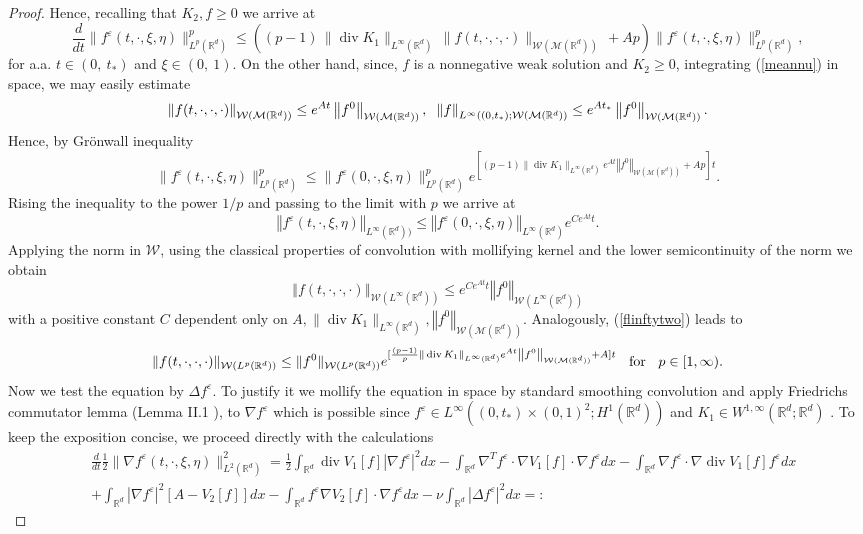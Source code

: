 \documentclass[10pt]{article}
\def\divv{\operatorname {div}}
\newcommand{\eqq}[2]{\begin{equation}  #1  \label{#2}\end{equation}    }
\newcommand{\hd}{\hspace{0.2cm}}
\newcommand{\m}[1]{\mbox{#1}}
\newcommand*{\norm}[1]{\left\Vert{#1}\right\Vert}
\newcommand*{\abs}[1]{\left\vert{#1}\right\vert}
\newcommand{\ve}{\varepsilon}
\newcommand{\R}{\mathbb{R}}
\newcommand{\ird}{\int_{\mathbb{R}^d}}
\newcommand{\W}{\mathcal{W}}
\begin{document}
\begin{proof}
Hence, recalling that $K_2, f \geq 0$ we arrive at
\[
\frac{d}{dt} \|f^\ve(t,\cdot,\xi,\eta)\|_{L^p(\R^d)}^p 
\leq \left((p-1)\,\|\divv K_1\|_{L^\infty(\R^d)}\,\| f(t,\cdot,\cdot,\cdot)\|_{\W(\mathcal{M}(\R^d))}\, + Ap\right)\|f^\ve(t,\cdot,\xi,\eta)\|_{L^p(\R^d)}^p,
\]
for a.a. $t\in (0,\ t_*)$ and $\xi\in (0,\ 1)$.
On the other hand, since, $f$ is a nonnegative weak solution and $K_2 \geq 0$, integrating (\ref{meannu}) in space,  we may easily estimate
\eqq{
\norm{f(t,\cdot,\cdot,\cdot)}_{\W(\mathcal{M}(\R^d))} \leq e^{At} \norm{f^0}_{\W(\mathcal{M}(\R^d))}, \hd \norm{f}_{L^{\infty}((0,t_*);\W(\mathcal{M}(\R^d))} \leq e^{At_*} \norm{f^0}_{\W(\mathcal{M}(\R^d))}.
}{flinfty}
Hence, by Gr\"onwall inequality
\eqq{
\|f^\ve(t,\cdot,\xi,\eta)\|_{L^p(\R^d)}^p \leq  \|f^\ve(0,\cdot,\xi,\eta)\|_{L^p(\R^d)}^p e^{[(p-1)\|\divv K_1\|_{L^\infty(\R^d)}e^{At}\norm{f^0}_{\W(\mathcal{M}(\R^d))} +Ap]t}.
}{flinftytwo}
Rising the inequality to the power $1/p$ and passing to the limit with $p$ we arrive at
\[
\norm{f^\ve(t,\cdot,\xi,\eta)}_{L^\infty(\R^d))} \leq \norm{f^\ve(0,\cdot,\xi,\eta)}_{L^\infty(\R^d)} e^{Ce^{At}t}.
\]
Applying the norm in $\W$, using the classical properties of convolution with mollifying kernel and the lower semicontinuity of the norm we obtain
\eqq{
 \norm{f(t,\cdot,\cdot,\cdot)}_{\W(L^\infty(\R^d))} \leq e^{Ce^{At}t}\norm{f^0}_{\W(L^\infty(\R^d))}
}{finftyinfty}
with a positive constant $C$ dependent only on $A, \|\divv K_1\|_{L^\infty(\R^d)},\norm{f^0}_{\W(\mathcal{M}(\R^d))}$. 
Analogously, (\ref{flinftytwo}) leads to
\eqq{
\|f(t,\cdot,\cdot,\cdot)\|_{\W(L^p(\R^d))} \leq  \|f^0\|_{\W(L^p(\R^d))}e^{[\frac{(p-1)}{p}\|\divv K_1\|_{L^\infty(\R^d)}e^{At}\norm{f^0}_{\W(\mathcal{M}(\R^d))} +A]t} \hd \m{ for } \hd p \in [1,\infty).
}{flinftytwof}
Now we test the equation by $\Delta f^\ve$. To justify it we mollify the equation in space by standard smoothing convolution and apply Friedrichs commutator lemma (Lemma II.1 \cite{diPerna}), to $\nabla f^\ve$ which is possible since $f^\ve \in L^{\infty}((0,t_{*})\times (0,1)^2;H^{1}(\R^d))$ and $K_1 \in W^{1,\infty}(\R^d;\R^d)$ . To keep the exposition concise, we proceed directly with the calculations
\begin{align}\label{gradba}
    &\frac{d}{dt} \frac{1}{2}\|\nabla f^\ve(t,\cdot,\xi,\eta)\|_{L^2(\R^d)}^2=\frac{1}{2}\ird \divv V_1[f] \abs{\nabla f^\ve}^{2} dx-\ird \nabla^T f^\ve\cdot \nabla V_1[f] \cdot \nabla f^\ve dx - \ird \nabla f^\ve \cdot \nabla \divv V_1[f]  f^\ve dx\\ \nonumber
    &+\ird \abs{\nabla{f^\ve}}^2[A-V_2[f]] dx - \ird f^\ve \nabla V_2[f] \cdot \nabla f^\ve dx -\nu \ird \abs{\Delta  f^\ve}^2dx =:

\end{align}
\end{proof}
\end{document}
